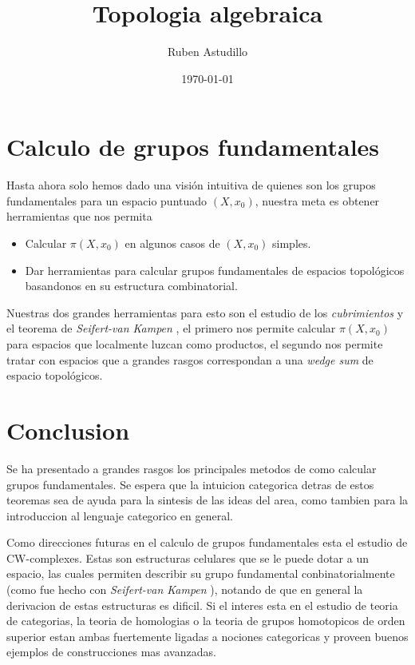 \documentclass[letterpaper]{article}
\newcommand{\vank}{\emph{Seifert-van Kampen} }
\theoremstyle{definition}
\theoremstyle{plain}
\theoremstyle{plain}
\theoremstyle{plain}
\theoremstyle{plain}
\theoremstyle{remark}
\theoremstyle{remark}
\begin{document}
\title{Topologia algebraica}
\author{Ruben Astudillo}
\date{\today}
\maketitle


\tableofcontents



\section{Calculo de grupos fundamentales}
Hasta ahora solo hemos dado una visión intuitiva de quienes son los
grupos fundamentales para un espacio puntuado \((X,x_0)\), nuestra meta
es obtener herramientas que nos permita
\begin{itemize}
\item Calcular \(\pi (X, x_0)\) en algunos casos de \((X,x_0)\) simples.
\item Dar herramientas para calcular grupos fundamentales de espacios
  topológicos basandonos en su estructura combinatorial.
\end{itemize}
Nuestras dos grandes herramientas para esto son el estudio de los
\emph{cubrimientos} y el teorema de \vank , el primero nos permite
calcular \(\pi (X, x_0)\) para espacios que localmente luzcan como
productos, el segundo nos permite tratar con espacios que a grandes
rasgos correspondan a una \emph{wedge sum} de espacio topológicos.




\section{Conclusion}
Se ha presentado a grandes rasgos los principales metodos de como
calcular grupos fundamentales. Se espera que la intuicion categorica
detras de estos teoremas sea de ayuda para la sintesis de las ideas del
area, como tambien para la introduccion al lenguaje categorico en
general.

Como direcciones futuras en el calculo de grupos fundamentales esta el
estudio de CW-complexes. Estas son estructuras celulares que se le puede
dotar a un espacio, las cuales permiten describir su grupo fundamental
conbinatorialmente (como fue hecho con \vank), notando de que en general
la derivacion de estas estructuras es dificil. Si el interes esta en el
estudio de teoria de categorias, la teoria de homologias o la teoria de
grupos homotopicos de orden superior estan ambas fuertemente ligadas a
nociones categoricas y proveen buenos ejemplos de construcciones mas
avanzadas.
\end{document}
